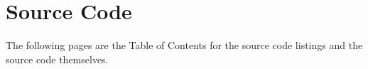 \chapter{Source Code}

The following pages are the Table of Contents for the source code listings and the source code themselves.